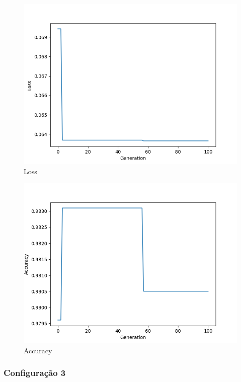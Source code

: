 \documentclass[twoside,conference,a4paper]{IEEEtran}
\begin{document}
\begin{figure}[htbp]
        \centering \includegraphics[width=1\columnwidth]{./ia_proj_images/mnist/2/loss.png}
        \caption{
                \label{fig:loss_mnist_02}
                Loss
        }
\end{figure}
\begin{figure}[htbp]
        \centering \includegraphics[width=1\columnwidth]{./ia_proj_images/mnist/2/acc.png}
        \caption{
                \label{fig:acc_mnist_02}
                Accuracy
        }
\end{figure}

\subsubsection{Configuração 3}
\end{document}
